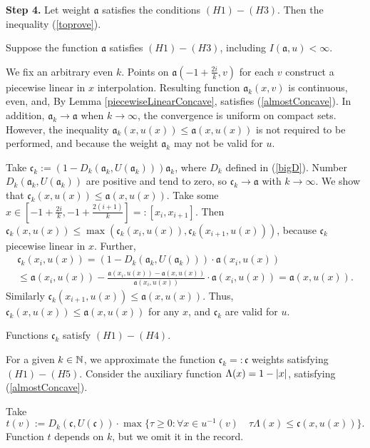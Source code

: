 \bigskip
{\bf Step 4.} Let weight $\mathfrak a$ satisfies the conditions $(H1)-(H3)$.
Then the inequality (\ref{toprove}).

Suppose the function $\mathfrak a$ satisfies $(H1)-(H3)$, including $I(\mathfrak a, u) < \infty$.

We fix an arbitrary even $k$.
Points on $\mathfrak a(-1 + \frac{2i}{k}, v)$ for each $v$ construct a piecewise linear in $x$ interpolation.
Resulting function $\mathfrak a_k(x, v)$ is continuous, even, and,
By Lemma \ref{piecewiseLinearConcave}, satisfies
(\ref{almostConcave}).
In addition, $\mathfrak a_k \to \mathfrak a$ when $k \to \infty$,
the convergence is uniform on compact sets.
However, the inequality $\mathfrak a_k(x, u(x)) \le \mathfrak a(x, u(x))$ is not required to be performed,
and because the weight $\mathfrak a_k$ may not be valid for $u$.

Take $\mathfrak c_k := (1 - D_k(\mathfrak a_k, U(\mathfrak a_k))) \mathfrak a_k$, where $D_k$ defined in (\ref{bigD}).
Number $D_k(\mathfrak a_k, U(\mathfrak a_k))$ are positive and tend to zero, so $\mathfrak c_k \to \mathfrak a$ with $k \to \infty$.
We show that $\mathfrak c_k(x, u(x)) \le \mathfrak a(x, u(x))$.
Take some
$x \in [-1 + \frac{2i}{k}, -1 + \frac{2(i + 1)}{k}] =: [x_i, x_{i + 1}]$.
Then $\mathfrak c_k(x, u(x)) \le \max( \mathfrak c_k(x_i, u(x)), \mathfrak c_k(x_{i + 1}, u(x)) )$, because
$\mathfrak c_k$ piecewise linear in $x$. Further,
\begin{multline*}
\mathfrak c_k (x_i, u (x)) = ( 1 - D_k (\mathfrak a_k, U (\mathfrak a_k))) \cdot \mathfrak a (x_i, u (x)) \\
\le \mathfrak a (x_i, u (x)) - \frac{\mathfrak a (x_i, u (x)) - \mathfrak a (x, u (x))}{\mathfrak a (x_i, u (x))} \cdot \mathfrak a ( x_i, u (x)) = \mathfrak a (x, u (x)).
\end{multline*}
Similarly $\mathfrak c_k(x_{i + 1}, u(x)) \le \mathfrak a(x, u(x))$.
Thus, $\mathfrak c_k(x, u(x)) \le \mathfrak a(x, u(x))$ for any $x$, and $\mathfrak c_k$ are valid for $u$.

Functions $\mathfrak c_k$ satisfy $(H1)-(H4)$.

For a given $k \in \mathbb N$, we approximate the function $\mathfrak c_k =: \mathfrak c$ weights satisfying $(H1)-(H5)$.
Consider the auxiliary function $\Lambda(x) = 1 - \left\vert x\right\vert$,
satisfying (\ref{almostConcave}).

Take
$$t(v):=D_k(\mathfrak c, U(\mathfrak c)) \cdot \max\{\tau \ge 0: \forall x \in u^{-1}(v) \quad \tau \Lambda(x) \le \mathfrak c(x, u(x))\}.$$
Function $t$ depends on $k$, but we omit it in the record.

